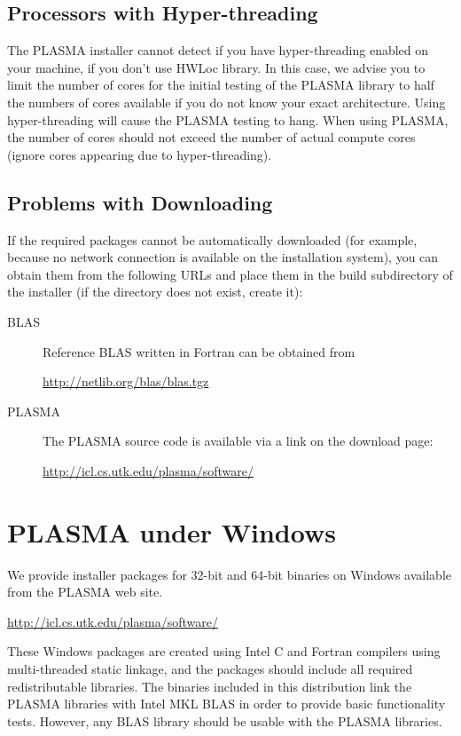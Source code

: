 \subsection{Processors with Hyper-threading}
The PLASMA installer cannot detect if you have hyper-threading enabled
on your machine, if you don’t use HWLoc library. In this case, we
advise you to limit the number of cores for the initial testing of the
PLASMA library to half the numbers of cores available if you do not
know your exact architecture.  Using hyper-threading will cause the
PLASMA testing to hang.  When using PLASMA, the number of cores should
not exceed the number of actual compute cores (ignore cores appearing
due to hyper-threading).

\subsection{Problems with Downloading}
If the required packages cannot be automatically downloaded (for
example, because no network connection is available on the
installation system),
you can obtain them from the following URLs and place
them in the build subdirectory of the installer  (if the directory does not exist, create
it):
\begin{description}
\item[BLAS] Reference BLAS written in Fortran can be obtained from
\begin{link_url}
\url{http://netlib.org/blas/blas.tgz}
\end{link_url}
\item[PLASMA] The PLASMA source code is available via a link on the download page:
\begin{link_url}
\url{http://icl.cs.utk.edu/plasma/software/}
\end{link_url}
\end{description}


\section{PLASMA under Windows}
\label{sec:wininstall}
We provide installer packages for 32-bit and 64-bit binaries on
Windows available from the PLASMA web site.  
\begin{link_url}
\url{http://icl.cs.utk.edu/plasma/software/}
\end{link_url}
These Windows packages are created using Intel C and Fortran compilers
using multi-threaded static linkage, and the packages should include
all required redistributable libraries.  The binaries included in this
distribution link the PLASMA libraries with Intel MKL BLAS in order to
provide basic functionality tests.  However, any BLAS library should
be usable with the PLASMA libraries.

